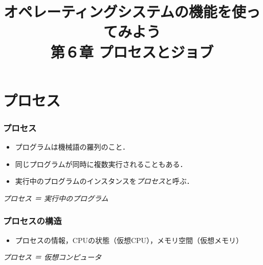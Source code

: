 \documentclass{beamer}                 %
\begin{document}
\title{オペレーティングシステムの機能を使ってみよう\\
第６章 プロセスとジョブ}
\date{}

\begin{frame}
  \titlepage
\end{frame}


\section{プロセス}
\begin{frame}[fragile]
  \frametitle{プロセス}

  \begin{itemize}
    \item プログラムは機械語の羅列のこと．
    \item 同じプログラムが同時に複数実行されることもある．
    \item 実行中のプログラムのインスタンスを\emph{プロセス}と呼ぶ．
  \end{itemize}

  \begin{center}
    \emph{\Large プロセス ＝ 実行中のプログラム}
  \end{center}
\end{frame}

\begin{frame}[fragile]
  \frametitle{プロセスの構造}

  \begin{itemize}
    \item プロセスの情報，CPUの状態（仮想CPU），メモリ空間（仮想メモリ）
  \end{itemize}

  \begin{center}
    \emph{\Large プロセス ＝ 仮想コンピュータ}
  \end{center}
\end{frame}
\end{document}
